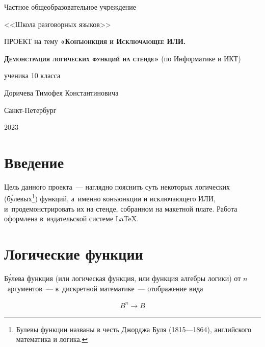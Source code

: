 \documentclass[a4paper,12pt]{article}
\begin{document}
\thispagestyle{empty}

\begin{center}
    {\huge
    Частное общеобразовательное учреждение
    
    <<Школа разговорных языков>>
    }
    \vfill
    \vfill
    \vfill
    \vfill
    {\huge \textsc{ПРОЕКТ}}
    \vfill
    {\huge на тему}
    \vfill
{\huge \textsc{\textbf{«Конъюнкция и Исключающее ИЛИ.}}}

\vspace{0.5cm}

{\huge \textsc{\textbf{Демонстрация логических функций на стенде»}}}
\vfill
{\huge (по Информатике и ИКТ)}

\vfill 
    
    \begin{flushright}
    {\Large ученика 10 класса 
    
    \vspace{0.5cm}

    Доричева Тимофея Константиновича}
    \end{flushright}
    \vfill
    {\Large Санкт-Петербург
    
    \vspace{0.5cm}

    2023}
\end{center}
\pagebreak

\tableofcontents

\section{Введение}

Цель данного проекта~--- наглядно пояснить суть некоторых логических (б\'{у}левых\footnote{Булевы функции названы в честь Джорджа Буля (1815—1864), английского математика и логика.}) функций, а~именно конъюнкции и исключающего ИЛИ, и~продемонстрировать их на стенде, собранном на макетной плате. Работа оформлена в~издательской системе \LaTeX.


\section{Логические функции}

Б\'{у}лева функция (или логическая функция, или функция алгебры логики) от $n$~аргументов~--- в~дискретной математике~--- отображение вида


\begin{align}\label{eq:BnB}
 B^n \rightarrow B
\end{align}
\end{document}

